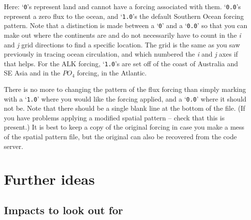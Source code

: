 \documentclass[11pt,fleqn]{book} %
\begin{document}
Here: ‘\texttt{0}’s represent land and cannot have a forcing associated with them. ‘\texttt{0.0}’s represent a zero flux to the ocean, and ‘\texttt{1.0}’s the default Southern Ocean forcing pattern. Note that a distinction is made between a ‘\texttt{0}’ and a ‘\texttt{0.0}’ so that you can make out where the continents are and do not necessarily have to count in the \textit{i} and \textit{j} grid directions to find a specific location. The grid is the same as you saw previously in tracing ocean circulation, and which numbered the \textit{i} and \textit{j} axes if that helps. For the ALK forcing, ‘\texttt{1.0}’s are set off of the coast of Australia and SE Asia and in the \(PO_{4}\) forcing, in the Atlantic.

There is no more to changing the pattern of the flux forcing than simply marking with a ‘\texttt{1.0}’ where you would like the forcing applied, and a ‘\texttt{0.0}’ where it should not be. Note that there should be a single blank line at the bottom of the file. (If you have problems applying a modified spatial pattern – check that this is present.) It is best to keep a copy of the original forcing in case you make a mess of the spatial pattern file, but the original can also be recovered from the code server.


\newpage


\section{Further ideas}


\subsection{Impacts to look out for}
\end{document}
